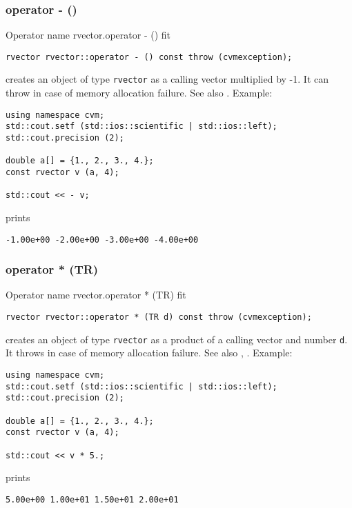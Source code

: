 \subsubsection{operator - ()}
Operator%
\pdfdest name {rvector.operator - ()} fit
\begin{verbatim}
rvector rvector::operator - () const throw (cvmexception);
\end{verbatim}
creates an object of type \verb"rvector" as
a calling vector multiplied by -1.
It can throw  
in case of memory allocation failure.
See also .
Example:
\begin{Verbatim}
using namespace cvm;
std::cout.setf (std::ios::scientific | std::ios::left); 
std::cout.precision (2);

double a[] = {1., 2., 3., 4.};
const rvector v (a, 4);

std::cout << - v;
\end{Verbatim}
prints
\begin{Verbatim}
-1.00e+00 -2.00e+00 -3.00e+00 -4.00e+00
\end{Verbatim}
\newpage


\subsubsection{operator * (TR)}
Operator%
\pdfdest name {rvector.operator * (TR)} fit
\begin{verbatim}
rvector rvector::operator * (TR d) const throw (cvmexception);
\end{verbatim}
creates an object of type \verb"rvector" as a product of
a calling vector and number \verb"d".
It throws  
in case of memory allocation failure.
See also ,
.
Example:
\begin{Verbatim}
using namespace cvm;
std::cout.setf (std::ios::scientific | std::ios::left); 
std::cout.precision (2);

double a[] = {1., 2., 3., 4.};
const rvector v (a, 4);

std::cout << v * 5.;
\end{Verbatim}
prints
\begin{Verbatim}
5.00e+00 1.00e+01 1.50e+01 2.00e+01
\end{Verbatim}
\newpage


